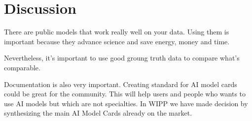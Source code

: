 \section{Discussion}
\label{sec:discussion}

There are public models that work really well on your data. Using them is
important because they advance science and save energy, money and time.

Nevertheless, it's important to use good groung truth data to compare what's
comparable.

Documentation is also very important. Creating standard for AI model cards could
be great for the community. This will help users and people who wants to use AI
models but which are not specialties. In WIPP we have made decision by
synthesizing the main AI Model Cards already on the market.

\def\firstellip{(1.6, 0) ellipse [x radius=2.7cm, y radius=1.5cm, rotate=50]}
\def\secondellip{(0.3, 1cm) ellipse [x radius=2.7cm, y radius=1.5cm, rotate=50]}
\def\thirdellip{(-1.6, 0) ellipse [x radius=2.7cm, y radius=1.5cm, rotate=-50]}
\def\fourthellip{(-0.3, 1cm) ellipse [x radius=2.7cm, y radius=1.5cm, rotate=-50]}

